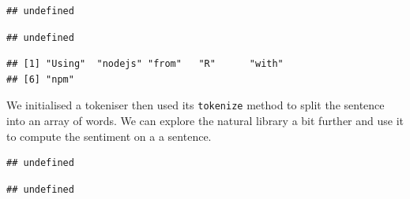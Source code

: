 \documentclass[
]{krantz}
\makeatletter
\newenvironment{Shaded}{\begin{snugshade}}{\end{snugshade}}
\newcommand{\KeywordTok}[1]{\textcolor[rgb]{0.27,0.27,0.27}{\textbf{#1}}}
\newcommand{\NormalTok}[1]{#1}
\newcommand{\OperatorTok}[1]{\textcolor[rgb]{0.43,0.43,0.43}{\textbf{#1}}}
\newcommand{\StringTok}[1]{\textcolor[rgb]{0.5,0.5,0.5}{#1}}
\newenvironment{kframe}{%
\medskip{}
\setlength{\fboxsep}{.8em}
 \def\at@end@of@kframe{}%
 \ifinner\ifhmode%
  \def\at@end@of@kframe{\end{minipage}}%
  \begin{minipage}{\columnwidth}%
 \fi\fi%
 \def\FrameCommand##1{\hskip\@totalleftmargin \hskip-\fboxsep
 \colorbox{shadecolor}{##1}\hskip-\fboxsep
     \hskip-\linewidth \hskip-\@totalleftmargin \hskip\columnwidth}%
 \MakeFramed {\advance\hsize-\width
   \@totalleftmargin\z@ \linewidth\hsize
   \@setminipage}}%
 {\par\unskip\endMakeFramed%
 \at@end@of@kframe}
\renewenvironment{Shaded}{\begin{kframe}}{\end{kframe}}
\makeatother
\begin{document}
\begin{verbatim}
## undefined
\end{verbatim}

\begin{Shaded}
\end{Shaded}

\begin{verbatim}
## undefined
\end{verbatim}

\begin{Shaded}
\end{Shaded}

\begin{verbatim}
## [1] "Using"  "nodejs" "from"   "R"      "with"  
## [6] "npm"
\end{verbatim}

We initialised a tokeniser then used its \texttt{tokenize} method to split the sentence into an array of words. We can explore the natural library a bit further and use it to compute the sentiment on a a sentence.

\begin{Shaded}
\end{Shaded}

\begin{verbatim}
## undefined
\end{verbatim}

\begin{Shaded}
\end{Shaded}

\begin{verbatim}
## undefined
\end{verbatim}
\end{document}
